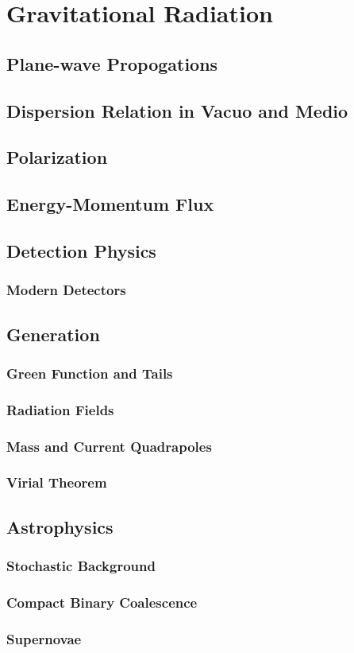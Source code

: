 \setchapterpreamble[u]{\margintoc}
\chapter{Gravitational Radiation}

\section{Plane-wave Propogations}
\section{Dispersion Relation in Vacuo and Medio}
\section{Polarization}
\section{Energy-Momentum Flux}

\section{Detection Physics}
\subsection{Modern Detectors}

\section{Generation}
\subsection{Green Function and Tails}
\subsection{Radiation Fields}
\subsection{Mass and Current Quadrapoles}
\subsection{Virial Theorem}

\section{Astrophysics}
\subsection{Stochastic Background}
\subsection{Compact Binary Coalescence}
\subsection{Supernovae}